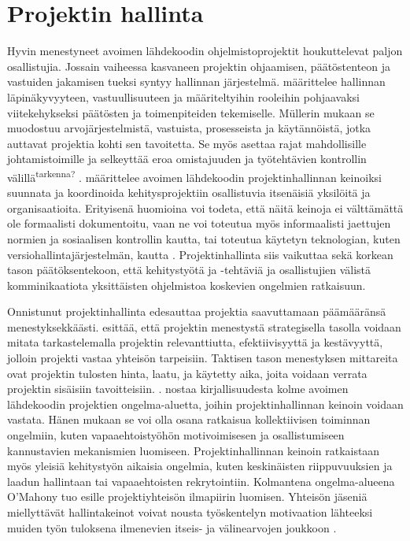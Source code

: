 \documentclass[utf8]{gradu3}
\begin{document}
\section{Projektin hallinta}
Hyvin menestyneet avoimen lähdekoodin ohjelmistoprojektit houkuttelevat paljon
osallistujia. Jossain vaiheessa kasvaneen projektin ohjaamisen, päätöstenteon ja
vastuiden jakamisen tueksi syntyy hallinnan järjestelmä. \textcite{Muller-2009}
määrittelee hallinnan läpinäkyvyyteen, vastuullisuuteen ja määriteltyihin
rooleihin pohjaavaksi viitekehykseksi päätösten ja toimenpiteiden tekemiselle.
Müllerin mukaan se muodostuu arvojärjestelmistä, vastuista, prosesseista ja
käytännöistä, jotka auttavat projektia kohti sen tavoitetta. Se myös asettaa
rajat mahdollisille johtamistoimille ja selkeyttää eroa omistajuuden ja
työtehtävien kontrollin välillä\textsuperscript{tarkenna?}
\parencite{Muller-2009}. \textcite{Markus-2007} määrittelee avoimen lähdekoodin
projektinhallinnan keinoiksi suunnata ja koordinoida kehitysprojektiin
osallistuvia itsenäisiä yksilöitä ja organisaatioita. Erityisenä huomioina voi
todeta, että näitä keinoja ei välttämättä ole formaalisti dokumentoitu, vaan ne
voi toteutua myös informaalisti jaettujen normien ja sosiaalisen kontrollin
kautta, tai toteutua käytetyn teknologian, kuten versiohallintajärjestelmän,
kautta \parencite{Markus-2007}. Projektinhallinta siis vaikuttaa sekä korkean
tason päätöksentekoon, että kehitystyötä ja -tehtäviä ja osallistujien välistä
komminikaatiota yksittäisten ohjelmistoa koskevien ongelmien ratkaisuun.

Onnistunut projektinhallinta edesauttaa projektia saavuttamaan päämääränsä
menestyksekkäästi. \textcite{Samset-2016} esittää, että projektin menestystä
strategisella tasolla voidaan mitata tarkastelemalla projektin relevanttiutta,
efektiivisyyttä ja kestävyyttä, jolloin projekti vastaa yhteisön tarpeisiin.
Taktisen tason menestyksen mittareita ovat projektin tulosten hinta, laatu, ja
käytetty aika, joita voidaan verrata projektin sisäisiin tavoitteisiin.
\parencite{Samset-2016}. \textcite{OMahony-2007} nostaa kirjallisuudesta kolme
avoimen lähdekoodin projektien ongelma-aluetta, joihin projektinhallinnan
keinoin voidaan vastata. Hänen mukaan se voi olla osana ratkaisua kollektiivisen
toiminnan ongelmiin, kuten vapaaehtoistyöhön motivoimisesen ja osallistumiseen
kannustavien mekanismien luomiseen. Projektinhallinnan keinoin ratkaistaan myös
yleisiä kehitystyön aikaisia ongelmia, kuten keskinäisten riippuvuuksien ja
laadun hallintaan tai vapaaehtoisten rekrytointiin. Kolmantena ongelma-alueena
O’Mahony tuo esille projektiyhteisön ilmapiirin luomisen. Yhteisön jäseniä
miellyttävät hallintakeinot voivat nousta työskentelyn motivaation lähteeksi
muiden työn tuloksena ilmenevien itseis- ja välinearvojen joukkoon
\parencite{OMahony-2007}.
\end{document}
